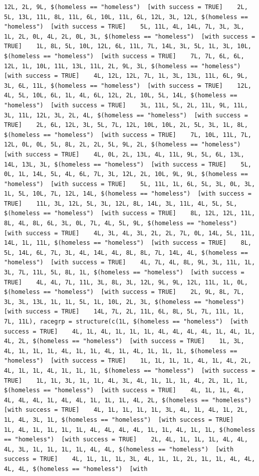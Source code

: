 \documentclass{tufte-book}\usepackage[]{graphicx}\usepackage[]{xcolor}
\makeatletter
\newenvironment{kframe}{%
 \def\at@end@of@kframe{}%
 \ifinner\ifhmode%
  \def\at@end@of@kframe{\end{minipage}}%
  \begin{minipage}{\columnwidth}%
 \fi\fi%
 \def\FrameCommand##1{\hskip\@totalleftmargin \hskip-\fboxsep
 \colorbox{shadecolor}{##1}\hskip-\fboxsep
     \hskip-\linewidth \hskip-\@totalleftmargin \hskip\columnwidth}%
 \MakeFramed {\advance\hsize-\width
   \@totalleftmargin\z@ \linewidth\hsize
   \@setminipage}}%
 {\par\unskip\endMakeFramed%
 \at@end@of@kframe}
\newenvironment{knitrout}{}{} %
\makeatother
\begin{document}
\begin{knitrout}
\begin{kframe}
\begin{verbatim}
12L, 2L, 9L, $(homeless == "homeless")  [with success = TRUE]    2L, 5L, 13L, 11L, 8L, 11L, 6L, 10L, 11L, 6L, 12L, 3L, 12L, $(homeless == "homeless")  [with success = TRUE]    5L, 11L, 4L, 14L, 7L, 3L, 3L, 1L, 2L, 0L, 4L, 2L, 0L, 3L, $(homeless == "homeless")  [with success = TRUE]    1L, 8L, 5L, 10L, 12L, 6L, 11L, 7L, 14L, 3L, 5L, 1L, 3L, 10L, $(homeless == "homeless")  [with success = TRUE]    7L, 7L, 6L, 6L, 12L, 1L, 10L, 11L, 13L, 11L, 2L, 9L, 3L, $(homeless == "homeless")  [with success = TRUE]    4L, 12L, 12L, 7L, 1L, 3L, 13L, 11L, 6L, 9L, 3L, 6L, 11L, $(homeless == "homeless")  [with success = TRUE]    12L, 4L, 5L, 10L, 6L, 1L, 4L, 6L, 12L, 2L, 10L, 5L, 14L, $(homeless == "homeless")  [with success = TRUE]    3L, 11L, 5L, 2L, 11L, 9L, 11L, 3L, 11L, 12L, 3L, 2L, 4L, $(homeless == "homeless")  [with success = TRUE]    2L, 6L, 12L, 3L, 5L, 7L, 12L, 10L, 10L, 2L, 5L, 3L, 1L, 8L, $(homeless == "homeless")  [with success = TRUE]    7L, 10L, 11L, 7L, 12L, 0L, 0L, 5L, 8L, 2L, 2L, 5L, 9L, 2L, $(homeless == "homeless")  [with success = TRUE]    4L, 0L, 2L, 13L, 4L, 11L, 9L, 5L, 6L, 13L, 14L, 13L, 3L, $(homeless == "homeless")  [with success = TRUE]    5L, 0L, 1L, 14L, 5L, 4L, 6L, 7L, 3L, 12L, 2L, 10L, 9L, 9L, $(homeless == "homeless")  [with success = TRUE]    5L, 11L, 1L, 6L, 5L, 3L, 0L, 3L, 1L, 5L, 10L, 7L, 12L, 14L, $(homeless == "homeless")  [with success = TRUE]    11L, 3L, 12L, 5L, 3L, 12L, 8L, 14L, 3L, 11L, 4L, 5L, 5L, $(homeless == "homeless")  [with success = TRUE]    8L, 12L, 12L, 11L, 8L, 4L, 8L, 6L, 3L, 0L, 7L, 4L, 5L, 9L, $(homeless == "homeless")  [with success = TRUE]    4L, 3L, 4L, 3L, 2L, 2L, 7L, 0L, 14L, 5L, 11L, 14L, 1L, 11L, $(homeless == "homeless")  [with success = TRUE]    8L, 5L, 14L, 6L, 7L, 3L, 4L, 14L, 4L, 8L, 8L, 7L, 14L, 4L, $(homeless == "homeless")  [with success = TRUE]    4L, 7L, 4L, 8L, 9L, 3L, 11L, 1L, 3L, 7L, 11L, 5L, 8L, 1L, $(homeless == "homeless")  [with success = TRUE]    4L, 4L, 7L, 11L, 3L, 8L, 3L, 12L, 9L, 9L, 12L, 11L, 1L, 0L, $(homeless == "homeless")  [with success = TRUE]    2L, 9L, 8L, 7L, 3L, 3L, 13L, 1L, 1L, 5L, 1L, 10L, 2L, 3L, $(homeless == "homeless")  [with success = TRUE]    14L, 7L, 2L, 11L, 6L, 8L, 5L, 7L, 11L, 1L, 7L, 11L), racegrp = structure(c(1L, $(homeless == "homeless")  [with success = TRUE]    4L, 1L, 4L, 1L, 1L, 1L, 4L, 4L, 4L, 4L, 1L, 4L, 1L, 4L, 2L, $(homeless == "homeless")  [with success = TRUE]    1L, 3L, 4L, 1L, 1L, 1L, 4L, 1L, 1L, 4L, 1L, 4L, 1L, 1L, 1L, $(homeless == "homeless")  [with success = TRUE]    1L, 1L, 1L, 1L, 4L, 1L, 4L, 2L, 4L, 1L, 1L, 4L, 1L, 1L, 1L, $(homeless == "homeless")  [with success = TRUE]    1L, 1L, 3L, 1L, 1L, 4L, 3L, 4L, 1L, 1L, 1L, 4L, 2L, 1L, 1L, $(homeless == "homeless")  [with success = TRUE]    4L, 1L, 1L, 4L, 4L, 4L, 4L, 1L, 4L, 4L, 1L, 1L, 1L, 4L, 2L, $(homeless == "homeless")  [with success = TRUE]    4L, 1L, 1L, 1L, 1L, 3L, 4L, 1L, 4L, 1L, 2L, 1L, 4L, 3L, 1L, $(homeless == "homeless")  [with success = TRUE]    1L, 4L, 1L, 1L, 1L, 1L, 4L, 4L, 4L, 4L, 1L, 1L, 4L, 1L, 1L, $(homeless == "homeless")  [with success = TRUE]    2L, 4L, 1L, 1L, 1L, 4L, 4L, 4L, 3L, 1L, 1L, 1L, 1L, 4L, 4L, $(homeless == "homeless")  [with success = TRUE]    4L, 1L, 1L, 1L, 3L, 4L, 1L, 1L, 2L, 1L, 1L, 4L, 4L, 4L, 4L, $(homeless == "homeless")  [with 
\end{verbatim}
\end{kframe}
\end{knitrout}
\end{document}
